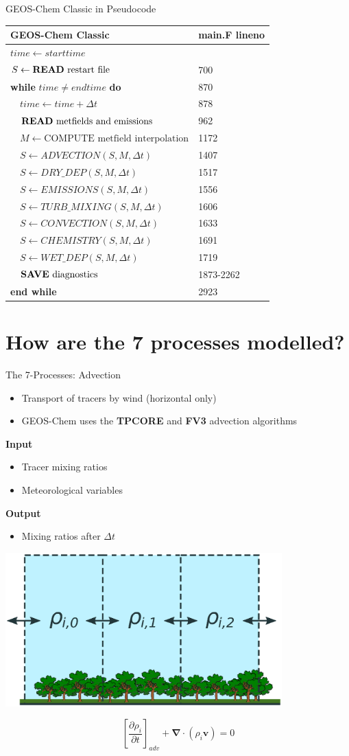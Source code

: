 \documentclass[10pt]{beamer}
\newcommand{\gccpseudocode}{%
    \small
    \setlength{\tabcolsep}{20pt}
    \begin{table}[]
    \begin{tabular}{ll}
    \hline
    \textbf{GEOS-Chem Classic} & main.F lineno \\ \hline
    $time \leftarrow starttime$ &  \\
    $S \leftarrow \text{\textbf{READ} restart file}$ &  700 \\
    \textbf{while} $time \neq endtime$ \textbf{do} & 870 \\
    $\quad time \leftarrow time + \Delta t$ & 878 \\
    $\quad \text{\textbf{READ} metfields and emissions}$ & 962 \\
    $\quad M \leftarrow \text{COMPUTE metfield interpolation}$ & 1172 \\
    $\quad S \leftarrow ADVECTION(S, M, \Delta t)$ & 1407 \\
    $\quad S \leftarrow DRY\_DEP(S, M, \Delta t)$ & 1517 \\
    $\quad S \leftarrow EMISSIONS(S, M, \Delta t)$ & 1556 \\
    $\quad S \leftarrow TURB\_MIXING(S, M, \Delta t)$ & 1606 \\
    $\quad S \leftarrow CONVECTION(S, M, \Delta t)$ & 1633 \\
    $\quad S \leftarrow CHEMISTRY(S, M, \Delta t)$& 1691 \\
    $\quad S \leftarrow WET\_DEP(S, M, \Delta t)$ & 1719 \\
    $\quad \text{\textbf{SAVE} diagnostics}$ & 1873-2262 \\
    \textbf{end while} & 2923 \\ \hline
    \end{tabular}
    \end{table}
}
\begin{document}
\begin{frame}[fragile]{GEOS-Chem Classic in Pseudocode}
    \gccpseudocode
\end{frame}

\section{How are the 7 processes modelled?}

\begin{frame}[fragile]{The 7-Processes: Advection}
    \begin{minipage}[c]{0.5\textwidth}
        \begin{itemize}
            \item Transport of tracers by wind (horizontal only)
            \item GEOS-Chem uses the \textbf{TPCORE} and \textbf{FV3} advection algorithms
        \end{itemize}
            \vspace{0.5cm}
            \textbf{Input} 
            \begin{itemize}
                \item Tracer mixing ratios
                \item Meteorological variables
            \end{itemize}
            \textbf{Output}
            \begin{itemize}
                \item Mixing ratios after $\Delta t$
            \end{itemize}
    \end{minipage} \hfill
    \begin{minipage}[c]{0.49\textwidth}
    \begin{center}
        \includegraphics[width=0.8\textwidth]{box-model-advection.eps}    
    \end{center}
    \vspace{0.5cm}
    $$
        \left[ \frac{\partial \rho_i}{\partial t} \right]_{adv} + \boldsymbol \nabla \cdot (\rho_i \boldsymbol v) = 0
    $$
    \end{minipage}
\end{frame}
\end{document}

